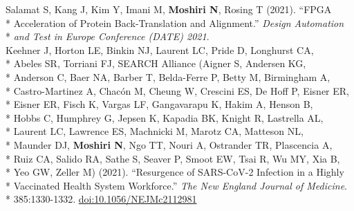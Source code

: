 \documentclass[margin,line]{res}
\begin{document}
\begin{resume}
\hspace*{4mm} Salamat S, Kang J, Kim Y, Imani M, \textbf{Moshiri N}, Rosing T (2021). ``FPGA\\*
\hspace*{9mm} Acceleration of Protein Back-Translation and Alignment.'' \textit{Design Automation}\\*\vspace{2mm}
\hspace*{8mm} \textit{and Test in Europe Conference (DATE) 2021}.\\
\hspace*{4mm} Keehner J, Horton LE, Binkin NJ, Laurent LC, Pride D, Longhurst CA,\\*
\hspace*{9mm} Abeles SR, Torriani FJ, SEARCH Alliance (Aigner S, Andersen KG,\\*
\hspace*{9mm} Anderson C, Baer NA, Barber T, Belda-Ferre P, Betty M, Birmingham A,\\*
\hspace*{9mm} Castro-Martinez A, Chac\'on M, Cheung W, Crescini ES, De Hoff P, Eisner ER,\\*
\hspace*{9mm} Eisner ER, Fisch K, Vargas LF, Gangavarapu K, Hakim A, Henson B,\\*
\hspace*{9mm} Hobbs C, Humphrey G, Jepsen K, Kapadia BK, Knight R, Lastrella AL,\\*
\hspace*{9mm} Laurent LC, Lawrence ES, Machnicki M, Marotz CA, Matteson NL,\\*
\hspace*{9mm} Maunder DJ, \textbf{Moshiri N}, Ngo TT, Nouri A, Ostrander TR, Plascencia A,\\*
\hspace*{9mm} Ruiz CA, Salido RA, Sathe S, Seaver P, Smoot EW, Tsai R, Wu MY, Xia B,\\*
\hspace*{9mm} Yeo GW, Zeller M) (2021). ``Resurgence of SARS-CoV-2 Infection in a Highly\\*
\hspace*{9mm} Vaccinated Health System Workforce.'' \textit{The New England Journal of Medicine}.\\*\vspace{2mm}
\hspace*{8mm} 385:1330-1332. \href{https://doi.org/10.1056/NEJMc2112981}{doi:10.1056/NEJMc2112981}\\

\end{resume}
\end{document}
